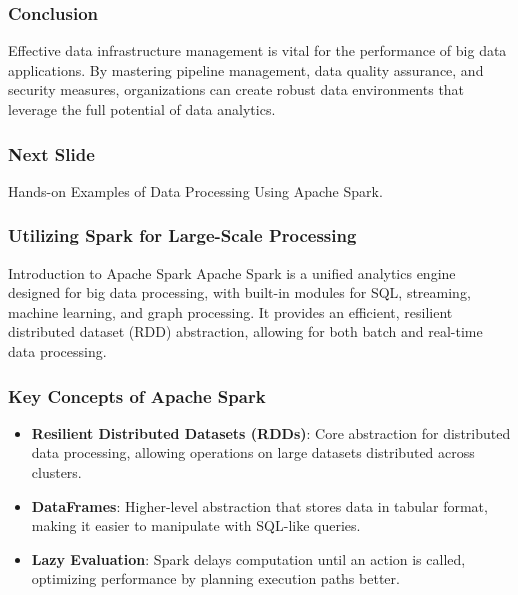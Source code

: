 \documentclass[aspectratio=169]{beamer}
\begin{document}
\begin{frame}
    \frametitle{Conclusion}
    Effective data infrastructure management is vital for the performance of big data applications. By mastering pipeline management, data quality assurance, and security measures, organizations can create robust data environments that leverage the full potential of data analytics.
\end{frame}

\begin{frame}
    \frametitle{Next Slide}
    Hands-on Examples of Data Processing Using Apache Spark.
\end{frame}

\begin{frame}[fragile]
  \frametitle{Utilizing Spark for Large-Scale Processing}
  \begin{block}{Introduction to Apache Spark}
    Apache Spark is a unified analytics engine designed for big data processing, with built-in modules for SQL, streaming, machine learning, and graph processing. It provides an efficient, resilient distributed dataset (RDD) abstraction, allowing for both batch and real-time data processing.
  \end{block}
\end{frame}

\begin{frame}[fragile]
  \frametitle{Key Concepts of Apache Spark}
  \begin{itemize}
    \item \textbf{Resilient Distributed Datasets (RDDs)}: Core abstraction for distributed data processing, allowing operations on large datasets distributed across clusters.
    \item \textbf{DataFrames}: Higher-level abstraction that stores data in tabular format, making it easier to manipulate with SQL-like queries.
    \item \textbf{Lazy Evaluation}: Spark delays computation until an action is called, optimizing performance by planning execution paths better.
  \end{itemize}
\end{frame}
\end{document}

